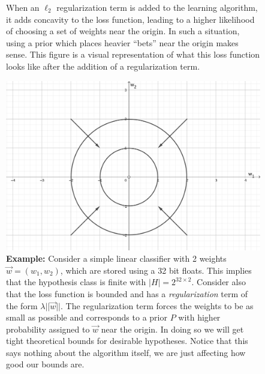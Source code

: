 \documentclass{article}
\begin{document}
\begin{figure}[H]
    \caption{When an $\ell_2$ regularization term is added to the learning algorithm, it adds concavity to the loss function, leading to a higher likelihood of choosing a set of weights near the origin. In such a situation, using a prior which places heavier ``bets'' near the origin makes sense. This figure is a visual representation of what this loss function looks like after the addition of a regularization term.}
\end{figure}

\vspace*{0.5cm}
\begin{figure}[H]
    \captionsetup{justification=centering}
	\includegraphics[scale=0.9,center]{circle.png}
    \caption{ \textbf{Example:} Consider a simple linear classifier with 2 weights $\Vec{w} = (w_1, w_2)$, which are stored using a 32 bit floats. This implies that the hypothesis class is finite with $|H|=2^{32 \times 2}$. Consider also that the loss function is bounded and has a \emph{regularization} term of the form $\lambda||\Vec{w}||$. The regularization term forces the weights to be as small as possible and corresponds to a prior $P$ with higher probability assigned to $\Vec{w}$ near the origin. In doing so we will get tight theoretical bounds for desirable hypotheses. Notice that this says nothing about the algorithm itself, we are just affecting how good our bounds are.}
\end{figure}
\end{document}
